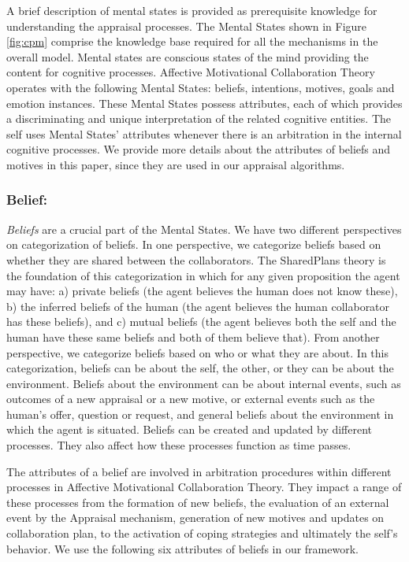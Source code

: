 \documentclass[letterpaper]{article}
\begin{document}
A brief description of mental states is provided as prerequisite knowledge for
understanding the appraisal processes. The Mental States shown in Figure
\ref{fig:cpm} comprise the knowledge base required for all the mechanisms in the
overall model. Mental states are conscious states of the mind providing the
content for cognitive processes. Affective Motivational Collaboration Theory
operates with the following Mental States: beliefs, intentions, motives, goals
and emotion instances. These Mental States possess attributes, each of which
provides a discriminating and unique interpretation of the related cognitive
entities. The self uses Mental States' attributes whenever there is an
arbitration in the internal cognitive processes. We provide more details about
the attributes of beliefs and motives in this paper, since they are used in our
appraisal algorithms.

\subsubsection{Belief:}

\textit{Beliefs} are a crucial part of the Mental States. We have two different
perspectives on categorization of beliefs. In one perspective, we categorize
beliefs based on whether they are shared between the collaborators. The
SharedPlans \cite{grosz:plans-discourse} theory is the foundation of this
categorization in which for any given proposition the agent may have: a) private
beliefs (the agent believes the human does not know these), b) the inferred
beliefs of the human (the agent believes the human collaborator has these
beliefs), and c) mutual beliefs (the agent believes both the self and the human
have these same beliefs and both of them believe that). From another
perspective, we categorize beliefs based on who or what they are about. In this
categorization, beliefs can be about the self, the other, or they can be about
the environment. Beliefs about the environment can be about internal events,
such as outcomes of a new appraisal or a new motive, or external events such as
the human's offer, question or request, and general beliefs about the
environment in which the agent is situated. Beliefs can be created and updated
by different processes. They also affect how these processes function as time
passes.

The attributes of a belief are involved in arbitration procedures within
different processes in Affective Motivational Collaboration Theory. They impact
a range of these processes from the formation of new beliefs, the evaluation of
an external event by the Appraisal mechanism, generation of new motives and
updates on collaboration plan, to the activation of coping strategies and
ultimately the self's behavior. We use the following six attributes of beliefs
in our framework.
\end{document}
